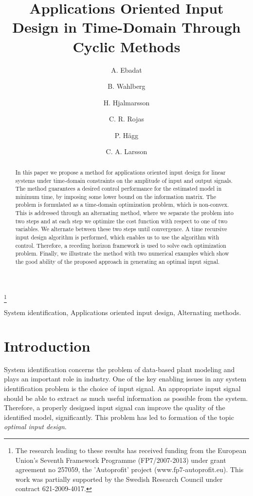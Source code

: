 \documentclass{ifacconf}
\begin{document}
\begin{frontmatter}

\title{Applications Oriented Input Design in Time-Domain Through Cyclic Methods}


\thanks[footnoteinfo]{The research leading to these results has received funding from the European Union’s Seventh Framework Programme (FP7/2007-2013) under grant agreement no 257059, the ’Autoprofit’ project (www.fp7-autoprofit.eu). This work was partially supported by the Swedish Research Council under contract 621-2009-4017.}
\author[First]{A. Ebadat}
\author[First]{B. Wahlberg}
\author[First]{H. Hjalmarsson}
\author[First]{C. R. Rojas}
\author[First]{P. H\"{a}gg}
\author[First]{C. A. Larsson}

\address[First]{ACCESS Linnaeus Center, School of Electrical Engineering, KTH – Royal Institute of Technology, SE-100 44 Stockholm, Sweden (e-mail: \{ebadat, bo, hjalmars, crro, pehagg, chrisla\}@kth.se).}


\begin{abstract}                In this paper we propose a method for applications oriented input design for linear systems under time-domain constraints on the amplitude of input and output signals. The method guarantees a desired control performance for the estimated model in minimum time, by imposing some lower bound on the information matrix. The problem is formulated as a time-domain optimization problem, which is non-convex. This is addressed through an alternating method, where we separate the problem into two steps and at each step we optimize the cost function with respect to one of two variables. We alternate between these two steps until convergence. A time recursive input design algorithm is performed, which enables us to use the algorithm with control. Therefore, a receding horizon framework is used to solve each optimization problem. Finally, we illustrate the method with two numerical examples which show the good ability of the proposed approach in generating an optimal input signal.
\end{abstract}

\begin{keyword}
System identification, Applications oriented input design, Alternating methods.
\end{keyword}

\end{frontmatter}


\section{Introduction}
System identification concerns the problem of data-based plant modeling and plays an important role in industry. One of the key enabling issues in any system identification problem is the choice of input signal. An appropriate input signal should be able to extract as much useful information as possible from the system. Therefore, a properly designed input signal can improve the quality of the identified model, significantly. This problem has led to formation of the topic \emph{optimal input design}. 
\end{document}
